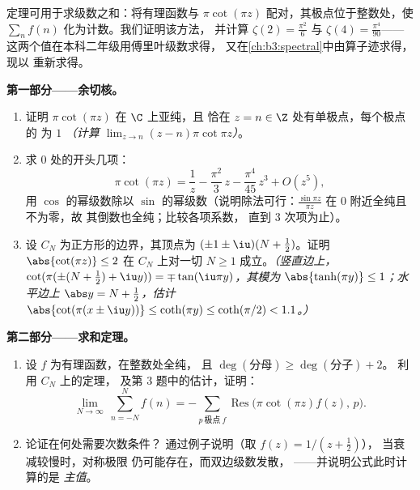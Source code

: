 \begin{problem}\label{pb:b3:residues:1}
定理可用于求级数之和：将有理函数与
$\pi\cot(\pi z)$ 配对，其极点位于整数处，使
$\sum_{n}f(n)$ 化为计数。我们证明该方法，
并计算 $\zeta(2) = \frac{\pi^2}{6}$ 与 $\zeta(4) =
\frac{\pi^4}{90}$——这两个值在本科二年级用傅里叶级数求得，
又在\cref{ch:b3:spectral}中由算子迹求得，现以
重新求得。

\medskip
\noindent\textbf{第一部分——余切核。}
\begin{enumerate}
  \item 证明 $\pi\cot(\pi z)$ 在 $\C$ 上亚纯，且
        恰在 $z = n \in \Z$ 处有单极点，每个极点的
        为 $1$ \emph{（计算
        $\lim_{z\to n}(z-n)\pi\cot\pi z$）}。
  \item 求 $0$ 处的开头几项：
        \[
        \pi\cot(\pi z) = \frac1z - \frac{\pi^2}{3}\,z -
        \frac{\pi^4}{45}\,z^3 + O(z^5) ,
        \]
        用 $\cos$ 的幂级数除以
        $\sin$ 的幂级数（说明除法可行：$\frac{\sin\pi z}{\pi z}$
        在 $0$ 附近全纯且不为零，故
        其倒数也全纯；比较各项系数，
        直到 $3$ 次项为止）。
  \item 设 $C_N$ 为正方形的边界，其顶点为
        $(\pm1\pm\iu)(N + \frac12)$。证明
        $\abs{\cot(\pi z)} \leq 2$ 在 $C_N$ 上对一切 $N \geq
        1$ 成立。\emph{（竖直边上，$\cot(\pi(\pm(N +
        \frac12) + \iu y)) = \mp\tan(\iu\pi y)$，其模为
        $\abs{\tanh(\pi y)} \leq 1$；水平边上
        $\abs y = N + \frac12$，估计
        $\abs{\cot(\pi(x\pm\iu y))} \leq \coth(\pi y) \leq
        \coth(\pi/2) < 1.1$。）}
\end{enumerate}

\medskip
\noindent\textbf{第二部分——求和定理。}
\begin{enumerate}[resume]
  \item 设 $f$ 为有理函数，在整数处全纯，
        且 $\deg(\text{分母}) \geq \deg(\text{分子}) + 2$。
        利用 $C_N$ 上的定理，
        及第 3 题中的估计，证明：
        \[
        \lim_{N\to\infty}\ \sum_{n = -N}^{N} f(n)
        = -\sum_{p\ \text{极点}\ f}
        \operatorname{Res}\bigl(\pi\cot(\pi z)f(z),\,p\bigr).
        \]
  \item 论证在何处需要次数条件？
        通过例子说明（取 $f(z) = 1/(z + \frac12)$），
        当衰减较慢时，对称极限
        仍可能存在，而双边级数发散，
——并说明公式此时计算的是
        \emph{主值}。
\end{enumerate}


\end{problem}
